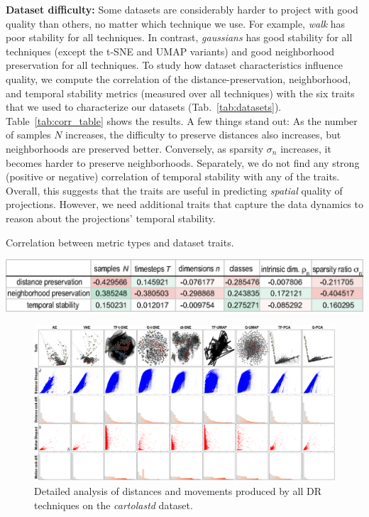 \noindent\textbf{Dataset difficulty:} Some datasets are considerably harder to project with good quality than others, no matter which technique we use. For example, \emph{walk} has poor stability for all techniques. In contrast, \emph{gaussians} has good stability for all techniques (except the t-SNE and UMAP variants) and good neighborhood preservation for all techniques. To study how dataset characteristics influence quality, we compute the correlation of the distance-preservation, neighborhood, and temporal stability metrics (measured over all techniques) with the six traits that we used to characterize our datasets (Tab.~\ref{tab:datasets}). Table~\ref{tab:corr_table} shows the results. A few things stand out: As the number of samples $N$ increases, the difficulty to preserve distances also increases, but neighborhoods are preserved better. Conversely, as sparsity $\sigma_n$ increases, it becomes harder to preserve neighborhoods. Separately, we do not find any strong (positive or negative) correlation of temporal stability with any of the traits. Overall, this suggests that the traits are useful in predicting \emph{spatial} quality of projections. However, we need additional traits that capture the data dynamics to reason about the projections' temporal stability.

\begin{table}[tb]
\centering
\caption{Correlation between metric types and dataset traits.}
\label{tab:corr_table}
\includegraphics[width=1.01\linewidth]{figures/projection-evaluation/corr_table.eps}
\end{table}

\begin{figure}[tb]\centering
\hspace*{-0.02\linewidth}
  \includegraphics[width=1.0\linewidth]{figures/projection-evaluation/detailed_cartolastd.pdf}
  \caption{Detailed analysis of distances and movements produced by all DR techniques on the \emph{cartolastd} dataset.}
  \vspace{-0.15cm}
  \label{fig:trails_cartolastd}
\end{figure}

